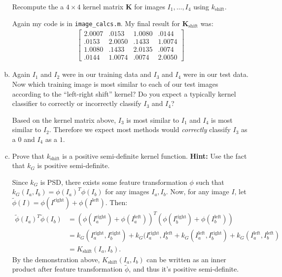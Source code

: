 \documentclass[10pt]{article}
\newcommand{\bv}[1]{\mathbf{#1}}
\begin{document}
\begin{enumerate}[(a)]
	Recompute the a $4\times 4$ kernel matrix $\bv{K}$ for images $I_1, \ldots, I_4$ using $k_{\text{shift}}$. 
	
	\color{blue}
	Again my code is in \texttt{image\_calcs.m}. My final result for $\bv{K}_{\text{shift}}$ was:
	\begin{align*}
	\begin{bmatrix}
	2.0007 & .0153 & 1.0080 & .0144 \\
	.0153 & 2.0050 & .1433 & 1.0074 \\
	1.0080 & .1433 & 2.0135 & .0074  \\
	.0144 & 1.0074 & .0074 & 2.0050
	\end{bmatrix}
	\end{align*}
	\color{black}
	
	\item Again $I_1$ and $I_2$ were in our training data and $I_3$ and $I_4$ were in our test data. Now which training image is most similar to each of our test images according to the ``left-right shift'' kernel? Do you expect a typically kernel classifier to correctly or incorrectly classify $I_3$ and $I_4$?
	
		\color{blue}
	Based on the kernel matrix above, $I_3$ is most similar to $I_1$ and $I_4$ is most similar to $I_2$. Therefore we expect most methods would \emph{correctly} classify $I_3$ as a $0$ and $I_4$ as a $1$. 
	\color{black}
	
	\item Prove that $k_{\text{shift}}$ is a positive semi-definite kernel function. \textbf{Hint:} Use the fact that $k_G$ is positive semi-definite.
	
	\color{blue}
	Since $k_{G}$ is PSD, there exists some feature transformation $\phi$ such that $k_G(I_a,I_b)=\phi(I_a)^T\phi(I_b)$ for any images $I_a, I_b$. 
 	Now, for any image $I$, let $\tilde{\phi}(I) = \phi(I^{\text{right}}) + \phi(I^{\text{left}})$. Then:
 	\begin{align*}
 		\tilde{\phi}(I_a)^T\tilde{\phi}(I_b) &= (\phi(I_a^{\text{right}}) + \phi(I_a^{\text{left}}))^T(\phi(I_b^{\text{right}}) + \phi(I_b^{\text{left}})) \\
 		&= k_G(I_a^{\text{right}},I_b^{\text{right}}) + k_G(I_a^{\text{right}},I_b^{\text{left}} + k_G(I_a^{\text{left}},I_b^{\text{right}}) + k_G(I_a^{\text{left}},I_b^{\text{left}}) \\
 		&= K_{\text{shift}}(I_a,I_b).
 	\end{align*}
 	By the demonstration above, $K_{\text{shift}}(I_a,I_b)$ can be written as an inner product after feature transformation $\tilde{\phi}$, and thus it's positive semi-definite. 
 	\color{black}
\end{enumerate}
\end{document}

